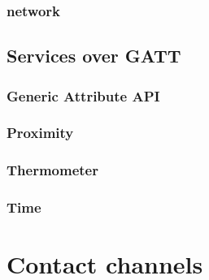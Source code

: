 \documentclass[11pt]{article}
\begin{document}
\subsubsection{network}

\subsection{Services over GATT}

\subsubsection{Generic Attribute API}
\subsubsection{Proximity}
\subsubsection{Thermometer}
\subsubsection{Time}

\section{Contact channels}
\end{document}
